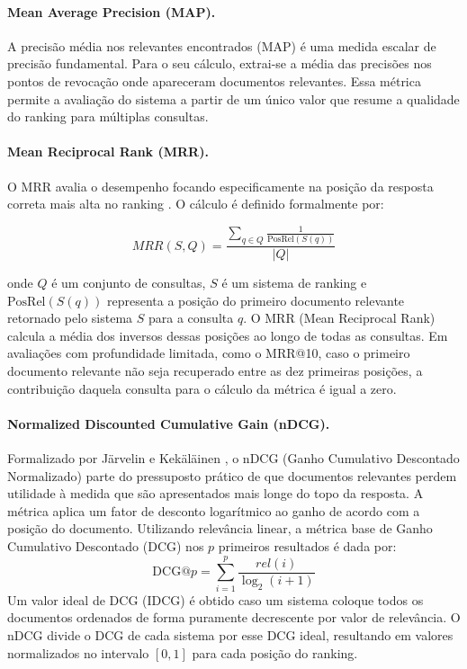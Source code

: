 \documentclass[12pt]{article}
\begin{document}
\paragraph{Mean Average Precision (MAP).} A precisão média nos relevantes encontrados (MAP) é uma medida escalar de precisão fundamental. Para o seu cálculo, extrai-se a média das precisões nos pontos de revocação onde apareceram documentos relevantes. Essa métrica permite a avaliação do sistema a partir de um único valor que resume a qualidade do ranking para múltiplas consultas.

\paragraph{Mean Reciprocal Rank (MRR).} O MRR avalia o desempenho focando especificamente na posição da resposta correta mais alta no ranking \cite{voorhees1999trec}. O cálculo é definido formalmente por:

\begin{equation}
MRR(S, Q) =
\frac{\displaystyle \sum_{q \in Q}
\frac{1}{\mathrm{PosRel}(S(q))}}
{|Q|}
\label{eq:mrr}
\end{equation}

onde $Q$ é um conjunto de consultas, $S$ é um sistema de ranking e $\mathrm{PosRel}(S(q))$ representa a posição do primeiro documento relevante retornado pelo sistema $S$ para a consulta $q$. O MRR (Mean Reciprocal Rank) calcula a média dos inversos dessas posições ao longo de todas as consultas. Em avaliações com profundidade limitada, como o MRR@10, caso o primeiro documento relevante não seja recuperado entre as dez primeiras posições, a contribuição daquela consulta para o cálculo da métrica é igual a zero.

\paragraph{Normalized Discounted Cumulative Gain (nDCG).} Formalizado por Järvelin e Kekäläinen \cite{jarvelin2002cumulated}, o nDCG (Ganho Cumulativo Descontado Normalizado) parte do pressuposto prático de que documentos relevantes perdem utilidade à medida que são apresentados mais longe do topo da resposta. A métrica aplica um fator de desconto logarítmico ao ganho de acordo com a posição do documento. Utilizando relevância linear, a métrica base de Ganho Cumulativo Descontado (DCG) nos $p$ primeiros resultados é dada por:
\begin{equation}
  \text{DCG@}p = \sum_{i=1}^{p} \frac{rel(i)}{\log_2(i+1)}
  \label{eq:dcg}
\end{equation}
Um valor ideal de DCG (IDCG) é obtido caso um sistema coloque todos os documentos ordenados de forma puramente decrescente por valor de relevância. O nDCG divide o DCG de cada sistema por esse DCG ideal, resultando em valores normalizados no intervalo $[0, 1]$ para cada posição do ranking.
\end{document}
